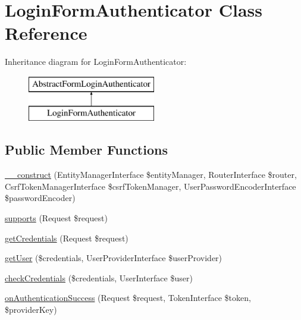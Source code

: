 \hypertarget{class_app_1_1_security_1_1_login_form_authenticator}{}\section{Login\+Form\+Authenticator Class Reference}
\label{class_app_1_1_security_1_1_login_form_authenticator}
Inheritance diagram for Login\+Form\+Authenticator\+:\begin{figure}[H]
\begin{center}
\leavevmode
\includegraphics[height=2.000000cm]{class_app_1_1_security_1_1_login_form_authenticator}
\end{center}
\end{figure}
\subsection*{Public Member Functions}
\begin{DoxyCompactItemize}
\item 
\mbox{\hyperlink{class_app_1_1_security_1_1_login_form_authenticator_a386db1bcf39d013d1954a9dacdfa7cc9}{\+\_\+\+\_\+construct}} (Entity\+Manager\+Interface \$entity\+Manager, Router\+Interface \$router, Csrf\+Token\+Manager\+Interface \$csrf\+Token\+Manager, User\+Password\+Encoder\+Interface \$password\+Encoder)
\item 
\mbox{\hyperlink{class_app_1_1_security_1_1_login_form_authenticator_addb128645c251651eb42448b73169298}{supports}} (Request \$request)
\item 
\mbox{\hyperlink{class_app_1_1_security_1_1_login_form_authenticator_ad41b8274f1d3afb081504580eb52c240}{get\+Credentials}} (Request \$request)
\item 
\mbox{\hyperlink{class_app_1_1_security_1_1_login_form_authenticator_a9d84a0770cd36499cfe7333405b73cfa}{get\+User}} (\$credentials, User\+Provider\+Interface \$user\+Provider)
\item 
\mbox{\hyperlink{class_app_1_1_security_1_1_login_form_authenticator_aa977a3b9e0fa2fe29ff81a53f6debbe4}{check\+Credentials}} (\$credentials, User\+Interface \$user)
\item 
\mbox{\hyperlink{class_app_1_1_security_1_1_login_form_authenticator_ad0f18bcab183b06e0bd0172951eca9c8}{on\+Authentication\+Success}} (Request \$request, Token\+Interface \$token, \$provider\+Key)
\end{DoxyCompactItemize}
